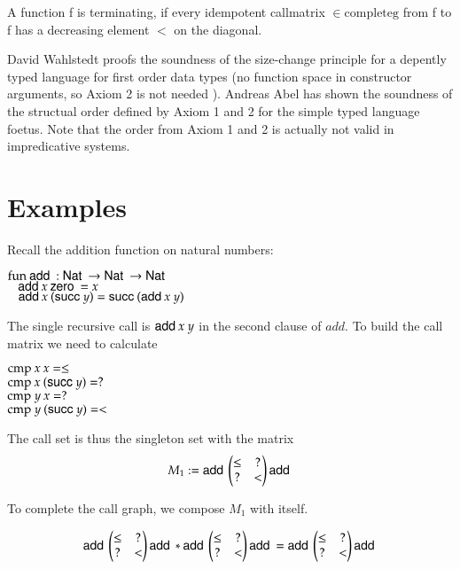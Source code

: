 \begin{definition}
A function f is terminating, if every idempotent callmatrix  $ \in \mathrm{complete g} $ from f to f has a decreasing element $<$ on
the diagonal.
\end{definition}

David Wahlstedt proofs the soundness of the size-change principle for a depently typed language 
for first order data types (no function space in constructor arguments, so Axiom 2 is not needed ).
Andreas Abel has shown the soundness of the structual order defined by Axiom 1 and 2 for the simple typed
language foetus.
Note that the order from Axiom 1 and 2 is actually not valid in impredicative systems.





\section{Examples}

Recall the addition function on natural numbers:

\begin{bsp}
$\mathrm{fun}\: \mathsf{add}\: : \mathsf{Nat}\: \rightarrow \mathsf{Nat}\: \rightarrow \mathsf{Nat}\:$\\
$\hspace*{3mm} \mathsf{add}\: x \: \mathsf{zero}\: = x $\\
$\hspace*{3mm} \mathsf{add}\: x \: (\mathsf{succ}\: y) = \mathsf{succ}\: (\mathsf{add}\: x \: y)  $
\end{bsp}
The single recursive call is $\mathsf{add}\: x \: y$ in the second clause of $add$.
To build the call matrix we need to calculate
\begin{bsp}
$\mathrm{cmp}\: x \: x = \leq $\\
$\mathrm{cmp}\: x \: (\mathsf{succ}\: y) = ? $\\
$\mathrm{cmp}\: y \: x = ? $\\
$\mathrm{cmp}\: y \: (\mathsf{succ}\: y) = < $ 
\end{bsp}

The call set is thus the singleton set with the matrix
\[
M_1 := \mathsf{add}\:\begin{pmatrix}
\leq & ? \\
?    & < \\
\end{pmatrix}\mathsf{add}\:
\]

To complete the call graph, we compose $M_1$ with itself.

\[
\mathsf{add}\:\begin{pmatrix}
\leq & ? \\
?    & < \\
\end{pmatrix}\mathsf{add}\:
* 
\mathsf{add}\:\begin{pmatrix}
\leq & ? \\
?    & < \\
\end{pmatrix}\mathsf{add}\:
=
\mathsf{add}\:\begin{pmatrix}
\leq & ? \\
?    & < \\
\end{pmatrix}\mathsf{add}\:
\]

